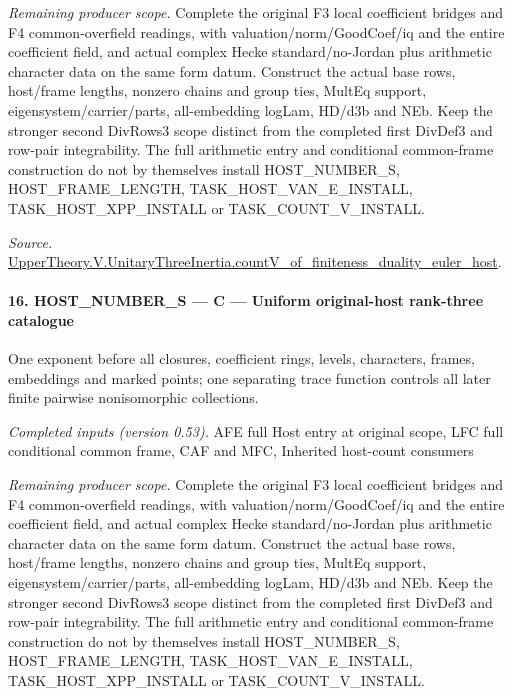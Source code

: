 \emph{Remaining producer scope.} Complete the original F3 local coefficient bridges and F4 common-overfield readings, with valuation/norm/GoodCoef/iq and the entire coefficient field, and actual complex Hecke standard/no-Jordan plus arithmetic character data on the same form datum. Construct the actual base rows, host/frame lengths, nonzero chains and group ties, MultEq support, eigensystem/carrier/parts, all-embedding logLam, HD/d3b and NEb. Keep the stronger second DivRows3 scope distinct from the completed first DivDef3 and row-pair integrability. The full arithmetic entry and conditional common-frame construction do not by themselves install HOST\_\allowbreak NUMBER\_\allowbreak S, HOST\_\allowbreak FRAME\_\allowbreak LENGTH, TASK\_\allowbreak HOST\_\allowbreak VAN\_\allowbreak E\_\allowbreak INSTALL, TASK\_\allowbreak HOST\_\allowbreak XPP\_\allowbreak INSTALL or TASK\_\allowbreak COUNT\_\allowbreak V\_\allowbreak INSTALL.

\emph{Source.} \href{https://github.com/CocoSgt/riemann-hypothesis-lean/blob/7cbf7a0c32fca1badf05931879a37c3f8a2b03b4/src/Development/AutomorphicArithmetic/AutomorphicVarieties/ModularityArgument/ThresholdArguments/DenseThresholdCases/CountVOf.lean#L33-L60}{UpperTheory.V.UnitaryThreeInertia.countV\_\allowbreak of\_\allowbreak finiteness\_\allowbreak duality\_\allowbreak euler\_\allowbreak host}.



\paragraph{16. HOST\_\allowbreak NUMBER\_\allowbreak S — C — Uniform original-host rank-three catalogue}

One exponent before all closures, coefficient rings, levels, characters, frames, embeddings and marked points; one separating trace function controls all later finite pairwise nonisomorphic collections.

\emph{Completed inputs (version 0.53).} AFE full Host entry at original scope, LFC full conditional common frame, CAF and MFC, Inherited host-count consumers

\emph{Remaining producer scope.} Complete the original F3 local coefficient bridges and F4 common-overfield readings, with valuation/norm/GoodCoef/iq and the entire coefficient field, and actual complex Hecke standard/no-Jordan plus arithmetic character data on the same form datum. Construct the actual base rows, host/frame lengths, nonzero chains and group ties, MultEq support, eigensystem/carrier/parts, all-embedding logLam, HD/d3b and NEb. Keep the stronger second DivRows3 scope distinct from the completed first DivDef3 and row-pair integrability. The full arithmetic entry and conditional common-frame construction do not by themselves install HOST\_\allowbreak NUMBER\_\allowbreak S, HOST\_\allowbreak FRAME\_\allowbreak LENGTH, TASK\_\allowbreak HOST\_\allowbreak VAN\_\allowbreak E\_\allowbreak INSTALL, TASK\_\allowbreak HOST\_\allowbreak XPP\_\allowbreak INSTALL or TASK\_\allowbreak COUNT\_\allowbreak V\_\allowbreak INSTALL.

